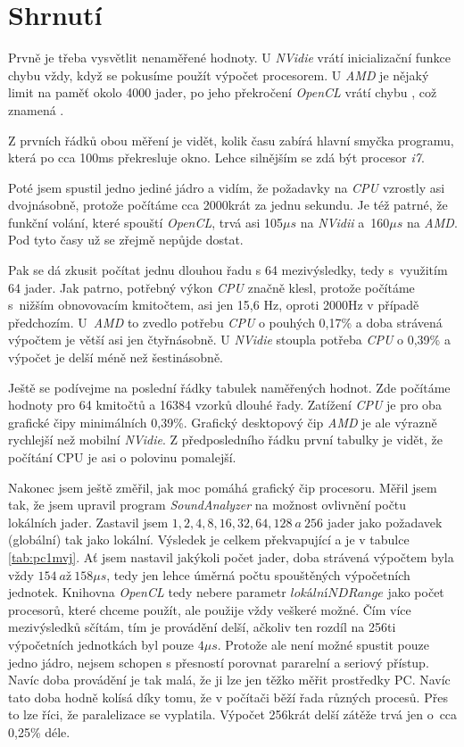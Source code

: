 \section{Shrnutí}

Prvně je třeba vysvětlit nenaměřené hodnoty. U \emph{NVidie} vrátí inicializační funkce chybu vždy, když se pokusíme použít výpočet procesorem. U \emph{AMD} je nějaký limit na paměť okolo 4000 jader, po jeho překročení \emph{OpenCL} vrátí chybu , což znamená .


Z prvních řádků obou měření je vidět, kolik času zabírá hlavní smyčka programu, která po cca 100ms překresluje okno. Lehce silnějším se zdá být procesor \emph{i7}.

Poté jsem spustil jedno jediné jádro a vidím, že požadavky na \emph{CPU} vzrostly asi dvojnásobně, protože počítáme cca 2000krát za jednu sekundu. Je též patrné, že
funkční volání, které spouští \emph{OpenCL}, trvá asi 105$\mu s$ na \emph{NVidii} a~160$\mu s$ na \emph{AMD}. Pod tyto časy už se zřejmě nepůjde dostat.

Pak se dá zkusit počítat jednu dlouhou řadu s 64 mezivýsledky, tedy s~využitím 64 jader. Jak patrno, potřebný výkon \emph{CPU} značně klesl, protože počítáme s~nižším obnovovacím kmitočtem, asi jen 15,6 Hz, oproti 2000Hz v případě předchozím. U~\emph{AMD} to zvedlo potřebu \emph{CPU} o pouhých 0,17\% a doba strávená výpočtem je větší asi jen čtyřnásobně. U \emph{NVidie} stoupla potřeba \emph{CPU} o 0,39\% a výpočet je delší méně než šestinásobně.


Ještě se podívejme na poslední řádky tabulek naměřených hodnot. Zde počítáme hodnoty pro 64 kmitočtů a 16384 vzorků dlouhé řady. Zatížení \emph{CPU} je pro oba grafické čipy minimálních 0,39\%. Grafický desktopový čip \emph{AMD} je ale výrazně rychlejší než mobilní \emph{NVidie}. Z předposledního řádku první tabulky je vidět, že počítání CPU je asi o polovinu pomalejší.


Nakonec jsem ještě změřil, jak moc pomáhá grafický čip procesoru. Měřil jsem tak, že jsem upravil program \emph{SoundAnalyzer} na možnost ovlivnění počtu lokálních jader.
Zastavil jsem $1,2,4,8,16,32,64,128~a~256$ jader jako požadavek (globální) tak jako lokální. Výsledek je celkem překvapující a je v tabulce \ref{tab:pc1mvj}. Ať jsem nastavil jakýkoli počet jader, doba strávená výpočtem byla vždy $154~až~158 \mu s$, tedy jen lehce úměrná počtu spouštěných výpočetních jednotek. Knihovna \emph{OpenCL} tedy nebere parametr $lokální NDRange$ jako počet procesorů, které chceme použít, ale použije vždy veškeré možné. Čím více mezivýsledků sčítám, tím je provádění delší, ačkoliv ten rozdíl na 256ti výpočetních jednotkách byl pouze $4 \mu s$. Protože ale není možné spustit pouze jedno jádro, nejsem schopen s přesností porovnat pararelní a seriový přístup. Navíc doba provádění je tak malá, že ji lze jen těžko měřit prostředky PC. Navíc tato doba hodně kolísá díky tomu, že v počítači běží řada různých procesů. Přes to lze říci, že paralelizace se vyplatila. Výpočet 256krát delší zátěže trvá jen o~cca 0,25\% déle.


